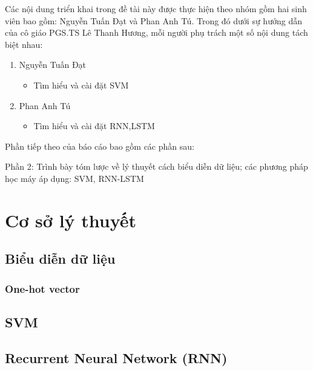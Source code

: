 \documentclass[a4paper,12pt]{report}
\begin{document}
Các nội dung triển khai trong đề tài này được thực hiện theo nhóm gồm hai sinh viên bao gồm: Nguyễn Tuấn Đạt và Phan Anh Tú. Trong đó dưới sự hướng dẫn của cô giáo PGS.TS Lê Thanh Hương, mỗi người phụ trách một số nội dung tách biệt nhau:
\begin{enumerate}
\item Nguyễn Tuấn Đạt
\begin{itemize}
\item Tìm hiểu và cài đặt SVM
\end{itemize}
\item Phan Anh Tú
\begin{itemize}
\item Tìm hiểu và cài đặt RNN,LSTM
\end{itemize}
\end{enumerate}
Phần tiếp theo của báo cáo bao gồm các phần sau:
\par Phần 2: Trình bày tóm lược về lý thuyết cách biểu diễn dữ liệu; các phương pháp học máy áp dụng: SVM, RNN-LSTM


\chapter{Cơ sở lý thuyết}
\section{Biểu diễn dữ liệu}
\subsection{One-hot vector}
\section{SVM}
\section{Recurrent Neural Network (RNN)}
\end{document}
